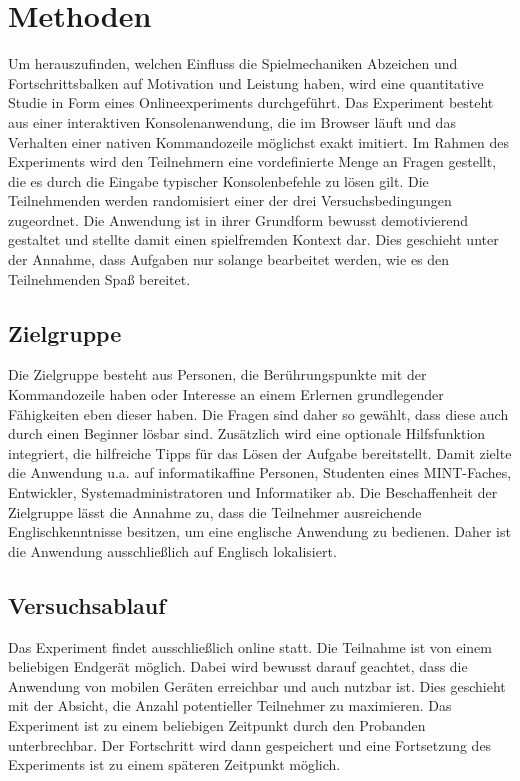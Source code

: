 \section{Methoden}

Um herauszufinden, welchen Einfluss die Spielmechaniken Abzeichen und Fortschrittsbalken auf Motivation und Leistung haben, wird eine quantitative Studie in Form eines Onlineexperiments durchgeführt. Das Experiment besteht aus einer interaktiven Konsolenanwendung, die im Browser läuft und das Verhalten einer nativen Kommandozeile möglichst exakt imitiert. Im Rahmen des Experiments wird den Teilnehmern eine vordefinierte Menge an Fragen gestellt, die es durch die Eingabe typischer Konsolenbefehle zu lösen gilt. Die Teilnehmenden werden randomisiert einer der drei Versuchsbedingungen zugeordnet. Die Anwendung ist in ihrer Grundform bewusst demotivierend gestaltet und stellte damit einen spielfremden Kontext dar. Dies geschieht unter der Annahme, dass Aufgaben nur solange bearbeitet werden, wie es den Teilnehmenden Spaß bereitet.

\subsection{Zielgruppe}
Die Zielgruppe besteht aus Personen, die Berührungspunkte mit der Kommandozeile haben oder Interesse an einem Erlernen grundlegender Fähigkeiten eben dieser haben. Die Fragen sind daher so gewählt, dass diese auch durch einen Beginner lösbar sind.
Zusätzlich wird eine optionale Hilfsfunktion integriert, die hilfreiche Tipps für das Lösen der Aufgabe bereitstellt.
Damit zielte die Anwendung u.a. auf informatikaffine Personen, Studenten eines MINT-Faches, Entwickler, Systemadministratoren und Informatiker ab. Die Beschaffenheit der Zielgruppe lässt die Annahme zu, dass die Teilnehmer ausreichende Englischkenntnisse besitzen, um eine englische Anwendung zu bedienen. Daher ist die Anwendung ausschließlich auf Englisch lokalisiert.

\subsection{Versuchsablauf}
Das Experiment findet ausschließlich online statt. Die Teilnahme ist von einem beliebigen Endgerät möglich. Dabei wird bewusst darauf geachtet, dass die Anwendung von mobilen Geräten erreichbar und auch nutzbar ist. Dies geschieht mit der Absicht, die Anzahl potentieller Teilnehmer zu maximieren. Das Experiment ist zu einem beliebigen Zeitpunkt durch den Probanden unterbrechbar. Der Fortschritt wird dann gespeichert und eine Fortsetzung des Experiments ist zu einem späteren Zeitpunkt möglich.

